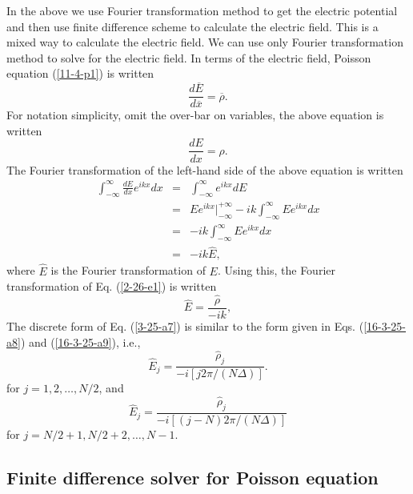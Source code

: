 \documentclass{article}
\newcommand{\nobracket}{}
\begin{document}
In the above we use Fourier transformation method to get the electric
potential and then use finite difference scheme to calculate the electric
field. This is a mixed way to calculate the electric field. We can use only
Fourier transformation method to solve for the electric field. In terms of the
electric field, Poisson equation (\ref{11-4-p1}) is written
\begin{equation}
  \frac{d \overline{E}}{d \overline{x}} = \overline{\rho} .
\end{equation}
For notation simplicity, omit the over-bar on variables, the above equation is
written
\begin{equation}
  \label{2-26-e1} \frac{d E}{d x} = \rho .
\end{equation}
The Fourier transformation of the left-hand side of the above equation is
written
\begin{eqnarray}
  \int_{- \infty}^{\infty} \frac{d E}{d x} e^{i k x} d x & = & \int_{-
  \infty}^{\infty} e^{i k x} d E \nonumber\\
  & = & E e^{i k x} |_{- \infty}^{+ \infty} \nobracket - i k \int_{-
  \infty}^{\infty} E e^{i k x} d x \nonumber\\
  & = & - i k \int_{- \infty}^{\infty} E e^{i k x} d x \\
  & = & - i k \hat{E}, \nonumber
\end{eqnarray}
where $\hat{E}$ is the Fourier transformation of $E$. Using this, the Fourier
transformation of Eq. (\ref{2-26-e1}) is written
\begin{equation}
  \label{3-25-a7} \hat{E} = \frac{\hat{\rho}}{- i k},
\end{equation}
The discrete form of Eq. (\ref{3-25-a7}) is similar to the form given in Eqs.
(\ref{16-3-25-a8}) and (\ref{16-3-25-a9}), i.e.,
\begin{equation}
  \label{16-3-25-a10} \hat{E}_j = \frac{\hat{\rho}_j}{- i [j 2 \pi / (N
  \Delta)]} .
\end{equation}
for $j = 1, 2, \ldots, N / 2$, and
\begin{equation}
  \label{16-3-25-a11} \hat{E}_j = \frac{\hat{\rho}_j}{- i [(j - N) 2 \pi / (N
  \Delta)]}
\end{equation}
for $j = N / 2 + 1, N / 2 + 2, \ldots, N - 1$.

\subsection{Finite difference solver for Poisson equation}
\end{document}
